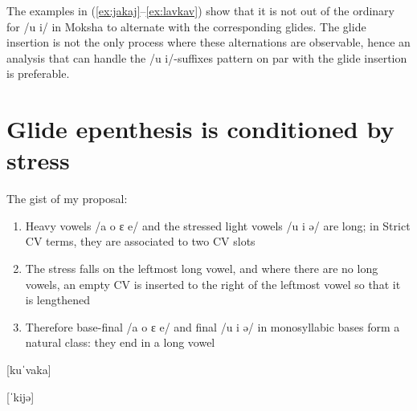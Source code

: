 \documentclass[a4paper, 12pt]{article}
\begin{document}
	\noindent The examples in (\ref{ex:jakaj}--\ref{ex:lavkav}) show that it is not out of the ordinary for /u i/ in Moksha to alternate with the corresponding glides. The glide insertion is not the only process where these alternations are observable, hence an analysis that can handle the /u i/-suffixes pattern on par with the glide insertion is preferable.
		
		\section{Glide epenthesis is conditioned by stress}\label{sec:proposal}

	The gist of my proposal:
	\begin{enumerate}[$\gg$]
		\item Heavy vowels /a o ɛ e/ and the stressed light vowels /u i ə/ are long; in Strict CV terms, they are associated to two CV slots
		\item The stress falls on the leftmost long vowel, and where there are no long vowels, an empty CV is inserted to the right of the leftmost vowel so that it is lengthened
		\item Therefore base-final /a o ɛ e/ and final /u i ə/ in monosyllabic bases form a natural class: they end in a long vowel
	\end{enumerate}
	
		\begin{minipage}{0.5\linewidth}
			\ex\label{fig:kuvaka} {[kuˈvaka]} \\
			\xe
		\end{minipage}
	\hfill	
		\begin{minipage}{0.4\linewidth}
			\ex\label{fig:kije} {[ˈkijə]} \\
			\xe
		\end{minipage}
		
\end{document}
